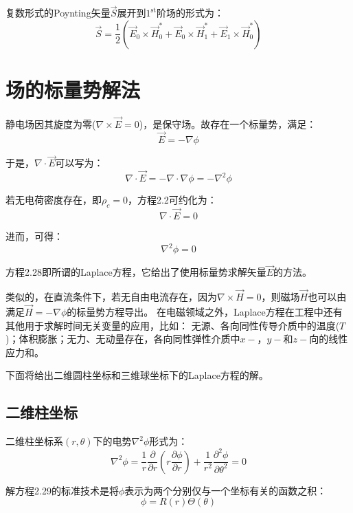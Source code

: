 复数形式的Poynting矢量$\vec{S}$展开到$\mathrm{1^{st}}$阶场的形式为：
\begin{equation}\label{eqn:1st poynting}
\vec{S}=\frac{1}{2}\left(\vec{E}_0\times \vec{H}_0^*+\vec{E}_0\times \vec{H}_1^*+\vec{E}_1\times \vec{H}_0^*\right)
\end{equation}

\section{场的标量势解法}
静电场因其旋度为零($\nabla \times \vec{E}=0$)，是保守场。故存在一个标量势，满足：
\begin{equation}
  \vec{E}=-\nabla \phi
\end{equation}

于是，$\nabla\cdot\vec{E}$可以写为：
\begin{equation}
  \nabla\cdot\vec{E}=-\nabla\cdot\nabla\phi=-\nabla^2\phi
\end{equation}

若无电荷密度存在，即$\rho_c=0$，方程2.2可约化为：
\begin{equation}
  \nabla\cdot\vec{E}=0
\end{equation}

进而，可得：
\begin{equation}
\nabla^2\phi=0
\end{equation}

方程2.28即所谓的Laplace方程，它给出了使用标量势求解矢量$\vec{E}$的方法。

类似的，在直流条件下，若无自由电流存在，因为$\nabla\times \vec{H}=0$，则磁场$\vec{H}$也可以由满足$\vec{H}=-\nabla \phi$的标量势方程导出。
在电磁领域之外，Laplace方程在工程中还有其他用于求解时间无关变量的应用，比如：
无源、各向同性传导介质中的温度($T$)；体积膨胀；无力、无动量存在，各向同性弹性介质中$x-$，$y-$和$z-$向的线性应力和。

下面将给出二维圆柱坐标和三维球坐标下的Laplace方程的解。
\subsection{二维柱坐标}
二维柱坐标系$(r,\theta)$下的电势$\nabla^2\phi$形式为：
\begin{equation}
  \nabla^2\phi = \frac{1}{r}\frac{\partial}{\partial r}\left(r\frac{\partial \phi}{\partial r}\right)+\frac{1}{r^2}\frac{\partial^2\phi}{\partial\theta^2}=0
\end{equation}

解方程2.29的标准技术是将$\phi$表示为两个分别仅与一个坐标有关的函数之积：
\begin{equation}
  \phi=R(r)\Theta(\theta)
\end{equation}

